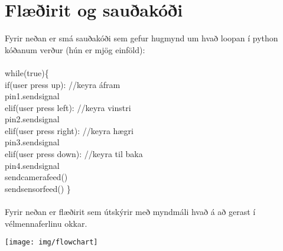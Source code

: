 \section{Flæðirit og sauðakóði}Fyrir neðan er smá sauðakóði sem gefur hugmynd um hvað loopan í python kóðanum verður (hún er mjög einföld):\\\\
while(true)\{\\
  if(user press up): //keyra áfram\\
  	pin1.sendsignal\\
  elif(user press left): //keyra vinstri\\
  	pin2.sendsignal\\
  elif(user press right): //keyra hægri\\
  	pin3.sendsignal\\
  elif(user press down): //keyra til baka\\
  	pin4.sendsignal\\
  sendcamerafeed()\\
  sendsensorfeed()
\}\\\\
Fyrir neðan er flæðirit sem útskýrir með myndmáli hvað á að gerast í vélmennaferlinu okkar.\\
\begin{center}
\texttt{[image: img/flowchart]}
\end{center}
